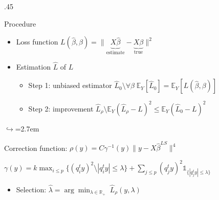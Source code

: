 \documentclass[,table]{beamer}
\newcommand{\soustitre}[1]{\vspace{5pt}{\small\textbf{\textcolor{bleuL}{#1}}}} %
\newcommand{\exemple}[1]{\textcolor{vertL!92!black}{#1}} %
\begin{document}
\begin{frame}{}
\begin{columns}[t]
\begin{column}{.45\linewidth}
\begin{block}{Procedure}
        \soustitre{Evaluation: Loss estimation}
        \begin{itemize}
        \item \exemple{Loss function}
          $L(\hat\beta,\beta)=\|\underbrace{X\hat\beta}_\text{estimate}-\underbrace{X\beta}_\text{true}\|^2$
        \item Estimation $\widehat{L}$ of $L$
          \vspace{5pt}
          \begin{itemize}
          \item Step 1: unbiased estimator $\widehat{L}_0 \setminus \forall
            \beta \;
            \mathbb{E}_Y[\widehat{L}_0]= \mathbb{E}_Y[L(\hat\beta,\beta)]$%
            \vspace{5pt}
          \item Step 2: improvement $\widehat{L}_\rho \setminus \mathbb{E}_{Y}(\widehat{L}_\rho-L)^2
            \le \mathbb{E}_{Y}(\widehat{L}_0-L)^2$
          \end{itemize}
        \end{itemize}
        \vspace{15pt}
        \begin{center}
        \end{center}
        {      \small
          \begin{list}{$\hookrightarrow$}{\leftmargin=2.7em}
          \item Correction function: $\rho(y) =C \gamma^{-1}(y) \|y-X\hat\beta^{LS}\|^4 $
            \vspace{3pt}
          \item $\gamma(y)=k\max_{i\le
              p}\{(q_i^ty)^2\setminus |q_i^ty|\le\lambda \}+ \sum_{j\le p} (q_j^ty)^2\mathds{1}_{\{ |q_j^ty|\le\lambda \}} $
          \end{list}
        }
        \vspace{15pt}
        \begin{itemize}
        \item Selection: $\hat\lambda = \displaystyle{\arg\min_{\lambda\in\mathbb{R}_+} }\;\widehat{L}_\rho \left(y,\lambda\right)$
        \end{itemize}
        \vspace{7pt}
      \end{block}
    \end{column}  
  \end{columns}


\end{frame}
\end{document}
